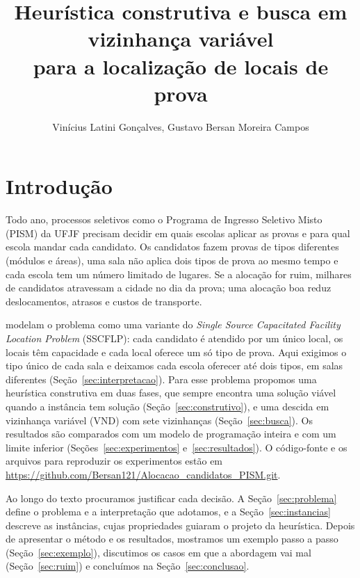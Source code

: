 \documentclass[12pt]{article}
\title{Heurística construtiva e busca em vizinhança variável\\
  para a localização de locais de prova}
\author{Vinícius Latini Gonçalves\inst{1}, Gustavo Bersan Moreira Campos\inst{1}}
\begin{document}
\maketitle

\section{Introdução}

Todo ano, processos seletivos como o Programa de Ingresso Seletivo Misto (PISM) da UFJF precisam
decidir em quais escolas aplicar as provas e para qual escola mandar cada candidato. Os candidatos
fazem provas de tipos diferentes (módulos e áreas), uma sala não aplica dois tipos de prova ao mesmo
tempo e cada escola tem um número limitado de lugares. Se a alocação for ruim, milhares de
candidatos atravessam a cidade no dia da prova; uma alocação boa reduz deslocamentos, atrasos e
custos de transporte.

\cite{oliveira2021} modelam o problema como uma variante do \emph{Single Source Capacitated
Facility Location Problem} (SSCFLP): cada candidato é atendido por um único local, os locais têm
capacidade e cada local oferece um só tipo de prova. Aqui exigimos o tipo único de cada sala e
deixamos cada escola oferecer até dois tipos, em salas diferentes
(Seção~\ref{sec:interpretacao}). Para esse problema propomos uma heurística construtiva em duas
fases, que sempre encontra uma solução viável quando a instância tem solução
(Seção~\ref{sec:construtivo}), e uma descida em vizinhança variável (VND) \cite{mladenovic1997} com
sete vizinhanças (Seção~\ref{sec:busca}). Os resultados são comparados com um modelo de programação
inteira e com um limite inferior (Seções~\ref{sec:experimentos} e~\ref{sec:resultados}). O
código-fonte e os arquivos para reproduzir os experimentos estão em
\url{https://github.com/Bersan121/Alocacao_candidatos_PISM.git}.

Ao longo do texto procuramos justificar cada decisão. A Seção~\ref{sec:problema} define o problema
e a interpretação que adotamos, e a Seção~\ref{sec:instancias} descreve as instâncias, cujas
propriedades guiaram o projeto da heurística. Depois de apresentar o método e os resultados,
mostramos um exemplo passo a passo (Seção~\ref{sec:exemplo}), discutimos os casos em que a
abordagem vai mal (Seção~\ref{sec:ruim}) e concluímos na Seção~\ref{sec:conclusao}.

\end{document}

